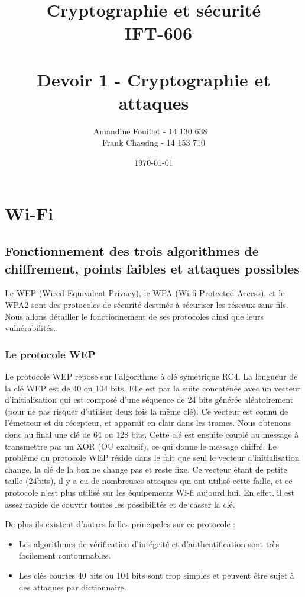 \documentclass[11pt]{article}
\title{\vspace{\fill} Cryptographie et sécurité \\ ~\textbf{IFT-606} \\~\\ Devoir 1 - Cryptographie et attaques}
\author{Amandine Fouillet - 14 130 638 ~\\ Frank Chassing - 14 153 710}
\date{\today \vspace{\fill}}
\begin{document}
\maketitle
\newpage \thispagestyle{empty}
\null
\newpage
\tableofcontents

\newpage
\section{Wi-Fi}
\subsection{Fonctionnement des trois algorithmes de chiffrement, points faibles et attaques possibles}
Le WEP (Wired Equivalent Privacy), le WPA (Wi-fi Protected Access), et le WPA2 sont des protocoles de sécurité destinés à sécuriser les réseaux sans fils. Nous allons détailler le fonctionnement de ses protocoles ainsi que leurs vulnérabilités.
\subsubsection{Le protocole WEP}
Le protocole WEP repose sur l’algorithme à clé symétrique RC4. La longueur de la clé WEP est de 40 ou 104 bits. Elle est par la suite concaténée avec un vecteur d’initialisation qui est composé d’une séquence de 24 bits générée aléatoirement (pour ne pas risquer d’utiliser deux fois la même clé). Ce vecteur est connu de l’émetteur et du récepteur, et apparait en clair dans les trames. Nous obtenons donc au final une clé de 64 ou 128 bits. Cette clé est ensuite couplé au message à transmettre par un XOR (OU exclusif), ce qui donne le message chiffré.
Le problème du protocole WEP réside dans le fait que seul le vecteur d’initialisation change, la clé de la box ne change pas et reste fixe. Ce vecteur étant de petite taille (24bits), il y a eu de nombreuses attaques qui ont utilisé cette faille, et ce protocole n’est plus utilisé sur les équipements Wi-fi aujourd’hui. En effet, il est assez rapide de couvrir toutes les possibilités et de casser la clé.

De plus ils existent d’autres failles principales sur ce protocole :
\begin{itemize}
\item 	Les algorithmes de vérification d’intégrité et d’authentification sont très facilement contournables.
\item 	Les clés courtes 40 bits ou 104 bits sont  trop simples et peuvent être sujet à des attaques par dictionnaire.
\end{itemize}
\end{document}
